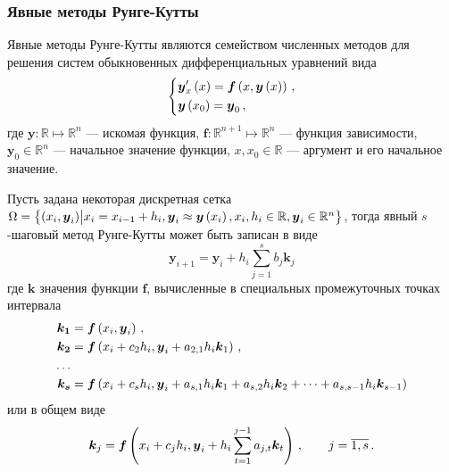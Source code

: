 \documentclass[../document.tex]{subfiles}
\begin{document}
			\subsubsection{Явные методы Рунге-Кутты}
				\par Явные методы Рунге-Кутты являются семейством численных методов для решения систем обыкновенных дифференциальных уравнений вида
				\begin{equation}
					\begin{dcases}
						\boldsymbol{y}^{\prime}_x\left(x\right)=\boldsymbol{f}\left(x,\boldsymbol{y}\left(x\right)\right)\,,\\
						\boldsymbol{y}\left(x_0\right)=\boldsymbol{y}_0\,,
					\end{dcases}
				\end{equation}
				где $\boldsymbol{y}:\mathbb{R}\mapsto\mathbb{R}^n$ --- искомая функция, $\boldsymbol{f}:\mathbb{R}^{n+1}\mapsto\mathbb{R}^n$ --- функция зависимости, $\boldsymbol{y}_0\in\mathbb{R}^n$ --- начальное значение функции, $x,x_0\in\mathbb{R}$ --- аргумент и его начальное значение.
				\par Пусть задана некоторая дискретная сетка\\ $\Omega=\left\{\left(x_i,\boldsymbol{y}_i\right)\bigr|x_i=x_{i-1}+h_i,\boldsymbol{y}_i\approx\boldsymbol{y}\left(x_i\right),x_i,h_i\in\mathbb{R},\boldsymbol{y}_i\in\mathbb{R}^n\right\}$, тогда явный $s$-шаговый метод Рунге-Кутты может быть записан в виде
				\begin{equation}
					\boldsymbol{y}_{i+1}=\boldsymbol{y}_i+h_i\sum\limits_{j=1}^{s}b_j\boldsymbol{k}_j
				\end{equation}
				где $\boldsymbol{k}$ значения функции $\boldsymbol{f}$, вычисленные в специальных промежуточных точках интервала
				\begin{equation}
					\begin{aligned}
						\boldsymbol{k_1}&=\boldsymbol{f}\left(x_i,\boldsymbol{y}_i\right)\,,\\
						\boldsymbol{k_2}&=\boldsymbol{f}\left(x_i+c_2h_i,\boldsymbol{y}_i+a_{2,1}h_i\boldsymbol{k}_1\right)\,,\\
						\dots&\\
						\boldsymbol{k_s}&=\boldsymbol{f}\left(x_i+c_sh_i,\boldsymbol{y}_i+a_{s,1}h_i\boldsymbol{k}_1+a_{s,2}h_i\boldsymbol{k}_2+\dots+a_{s,s-1}h_i\boldsymbol{k}_{s-1}\right)
					\end{aligned}
				\end{equation}
				или в общем виде 
				\begin{equation}
					\boldsymbol{k}_j=\boldsymbol{f}\left(x_i+c_jh_i,\boldsymbol{y}_i+h_i\sum\limits_{t=1}^{j-1}a_{j,t}\boldsymbol{k}_t\right)\,,\qquad j=\overline{1,s}\,.
				\end{equation}
\end{document}

